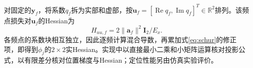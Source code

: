 \documentclass[a4paper,fleqn]{cas-sc}
\numberwithin{equation}{section}
\numberwithin{figure}{section}
\numberwithin{table}{section}
\newcommand{\R}{\mathbb R}
\newcommand{\Rea}{\operatorname{Re}}
\begin{document}
对固定的$\bm y_f$，将系数$q_f$拆为实部和虚部，按$\bm u_f=[\Rea q_f,\operatorname{Im}q_f]^T\in\R^2$排列。该频点损失对$\bm u_f$的Hessian为
\begin{equation}
 H_{uu,f}=2\|\bm a_f\|^2\bm I_2/E_x .
\end{equation}
各频点的系数块相互独立，因此逐频计算混合导数，再累加式\eqref{eq:schur}的修正项，即得到$\phi_j$的$2\times2$实Hessian。实现中以直接最小二乘和小矩阵运算核对投影公式，以有限差分核对位置梯度与Hessian；定位性能另由仿真实验评价。


\FloatBarrier


\end{document}
